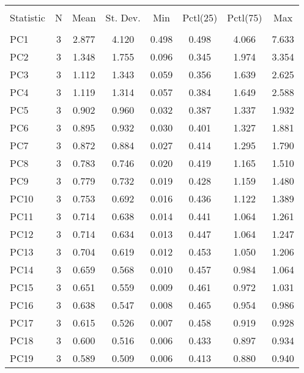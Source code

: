 
\begin{table}[!htbp] \centering 
  \caption{} 
  \label{} 
\begin{tabular}{@{\extracolsep{5pt}}lccccccc} 
\\[-1.8ex]\hline 
\hline \\[-1.8ex] 
Statistic & \multicolumn{1}{c}{N} & \multicolumn{1}{c}{Mean} & \multicolumn{1}{c}{St. Dev.} & \multicolumn{1}{c}{Min} & \multicolumn{1}{c}{Pctl(25)} & \multicolumn{1}{c}{Pctl(75)} & \multicolumn{1}{c}{Max} \\ 
\hline \\[-1.8ex] 
PC1 & 3 & 2.877 & 4.120 & 0.498 & 0.498 & 4.066 & 7.633 \\ 
PC2 & 3 & 1.348 & 1.755 & 0.096 & 0.345 & 1.974 & 3.354 \\ 
PC3 & 3 & 1.112 & 1.343 & 0.059 & 0.356 & 1.639 & 2.625 \\ 
PC4 & 3 & 1.119 & 1.314 & 0.057 & 0.384 & 1.649 & 2.588 \\ 
PC5 & 3 & 0.902 & 0.960 & 0.032 & 0.387 & 1.337 & 1.932 \\ 
PC6 & 3 & 0.895 & 0.932 & 0.030 & 0.401 & 1.327 & 1.881 \\ 
PC7 & 3 & 0.872 & 0.884 & 0.027 & 0.414 & 1.295 & 1.790 \\ 
PC8 & 3 & 0.783 & 0.746 & 0.020 & 0.419 & 1.165 & 1.510 \\ 
PC9 & 3 & 0.779 & 0.732 & 0.019 & 0.428 & 1.159 & 1.480 \\ 
PC10 & 3 & 0.753 & 0.692 & 0.016 & 0.436 & 1.122 & 1.389 \\ 
PC11 & 3 & 0.714 & 0.638 & 0.014 & 0.441 & 1.064 & 1.261 \\ 
PC12 & 3 & 0.714 & 0.634 & 0.013 & 0.447 & 1.064 & 1.247 \\ 
PC13 & 3 & 0.704 & 0.619 & 0.012 & 0.453 & 1.050 & 1.206 \\ 
PC14 & 3 & 0.659 & 0.568 & 0.010 & 0.457 & 0.984 & 1.064 \\ 
PC15 & 3 & 0.651 & 0.559 & 0.009 & 0.461 & 0.972 & 1.031 \\ 
PC16 & 3 & 0.638 & 0.547 & 0.008 & 0.465 & 0.954 & 0.986 \\ 
PC17 & 3 & 0.615 & 0.526 & 0.007 & 0.458 & 0.919 & 0.928 \\ 
PC18 & 3 & 0.600 & 0.516 & 0.006 & 0.433 & 0.897 & 0.934 \\ 
PC19 & 3 & 0.589 & 0.509 & 0.006 & 0.413 & 0.880 & 0.940 \\ 

\end{tabular}
\end{table}
